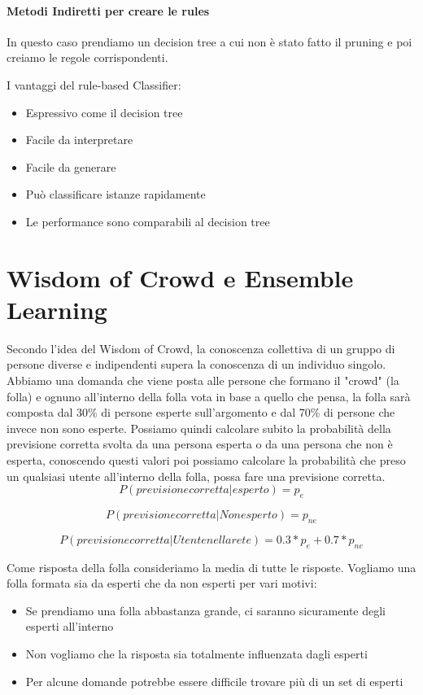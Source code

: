 \documentclass[14pt]{extreport}
\begin{document}
\subsubsection{Metodi Indiretti per creare le rules}

In questo caso prendiamo un decision tree a cui non è stato fatto il pruning e poi creiamo le regole corrispondenti.

I vantaggi del rule-based Classifier:
\begin{itemize}
    \item Espressivo come il decision tree
    \item Facile da interpretare
    \item Facile da generare
    \item Può classificare istanze rapidamente
    \item Le performance sono comparabili al decision tree
\end{itemize}

\chapter{Wisdom of Crowd e Ensemble Learning}

Secondo l'idea del Wisdom of Crowd, la conoscenza collettiva di un gruppo di persone diverse e indipendenti supera la conoscenza di un individuo singolo. 
Abbiamo una domanda che viene posta alle persone che formano il "crowd" (la folla) e ognuno all'interno della folla vota in base a quello che pensa, la folla sarà composta dal 30\% di persone esperte sull'argomento e dal 70\% di persone che invece non sono esperte.
Possiamo quindi calcolare subito la probabilità della previsione corretta svolta da una persona esperta o da una persona che non è esperta, conoscendo questi valori poi possiamo calcolare la probabilità che preso un qualsiasi utente all'interno della folla, possa fare una previsione corretta.
\begin{equation}
    P(previsione corretta | esperto) = p_e
\end{equation}

\begin{equation}
    P(previsione corretta | Non esperto) = p_{ne}
\end{equation}

\begin{equation}
    P(previsione corretta | Utente nella rete) = 0.3*p_e + 0.7*p_{ne}
\end{equation}

Come risposta della folla consideriamo la media di tutte le risposte. Vogliamo una folla formata sia da esperti che da non esperti per vari motivi:
\begin{itemize}
    \item Se prendiamo una folla abbastanza grande, ci saranno sicuramente degli esperti all'interno
    \item Non vogliamo che la risposta sia totalmente influenzata dagli esperti
    \item Per alcune domande potrebbe essere difficile trovare più di un set di esperti
\end{itemize}
\end{document}
